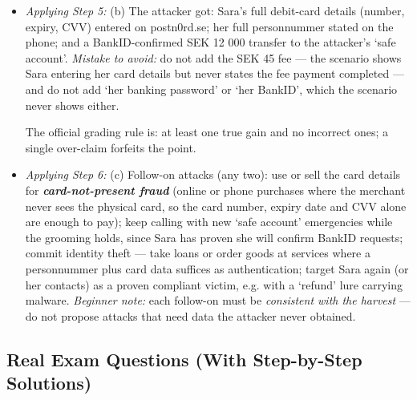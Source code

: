 \documentclass[12pt, a4paper]{article}
\newcommand{\term}[1]{\textbf{\textit{#1}}}        %
\begin{document}
\begin{itemize}
    rapport --- `asks how the weather is in Lund, and jokes about the rain he biked through'; victim role --- the created crisis (fake pending transactions) that Mikael then `fixes' via the `shielded safe account', sealed by the closing flattery `together we caught the thief'.
    Any three full triples earn full marks. \emph{Mistake to avoid 1:} a strategy name alone is worth only 1 of 3 points; the rubric pays per element.
    \emph{Mistake to avoid 2:} do not label `several customers in your area were hit' as peer pressure/social proof --- Sara is not asked to imitate anyone's behaviour; the line establishes that the fraud wave is real, so it is evidence for fear/threat (or role trappings), not conformity.
    \item \textit{Applying Step 5:} (b) The attacker got: Sara's full debit-card details (number, expiry, CVV) entered on postn0rd.se; her full personnummer stated on the phone; and a BankID-confirmed SEK 12 000 transfer to the attacker's `safe account'.
    \emph{Mistake to avoid:} do not add the SEK 45 fee --- the scenario shows Sara entering her card details but never states the fee payment completed --- and do not add `her banking password' or `her BankID', which the scenario never shows either.

    The official grading rule is: at least one true gain and no incorrect ones; a single over-claim forfeits the point.
    \item \textit{Applying Step 6:} (c) Follow-on attacks (any two): use or sell the card details for \term{card-not-present fraud} (online or phone purchases where the merchant never sees the physical card, so the card number, expiry date and CVV alone are enough to pay);
    keep calling with new `safe account' emergencies while the grooming holds, since Sara has proven she will confirm BankID requests; commit identity theft --- take loans or order goods at services where a personnummer plus card data suffices as authentication;
    target Sara again (or her contacts) as a proven compliant victim, e.g. with a `refund' lure carrying malware. \emph{Beginner note:} each follow-on must be \emph{consistent with the harvest} --- do not propose attacks that need data the attacker never obtained.
\end{itemize}

\subsection*{Real Exam Questions (With Step-by-Step Solutions)}
\end{document}

